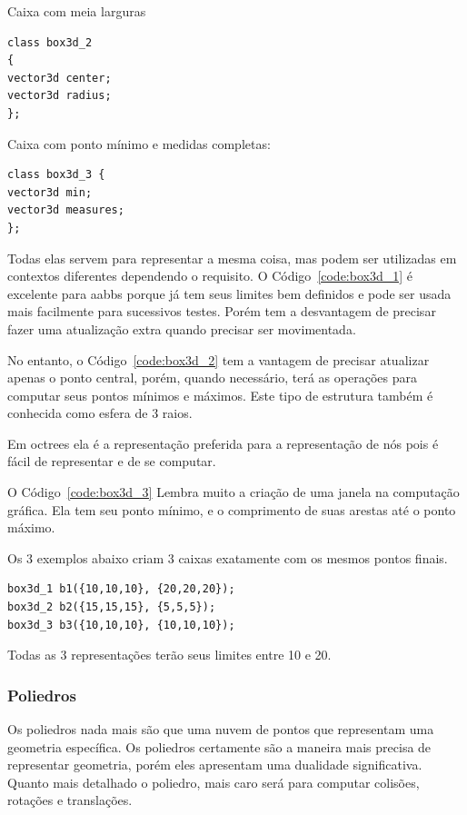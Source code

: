 Caixa com meia larguras

\begin{lstlisting}[frame=single,caption=Exemplo de caixa com meias larguras\label{code:box3d_2}]
class box3d_2
{
vector3d center;
vector3d radius;
};
\end{lstlisting}

Caixa com ponto mínimo e medidas completas:

\begin{lstlisting}[frame=single,caption=Exemplo de caixa  com arestas\label{code:box3d_3}]
class box3d_3 {
vector3d min;
vector3d measures;
};
\end{lstlisting}

Todas elas servem para representar a mesma coisa, mas podem ser utilizadas em
contextos diferentes dependendo o requisito. O Código~\ref{code:box3d_1} é excelente para aabbs
porque já tem seus limites bem definidos e pode ser usada mais facilmente para
sucessivos testes. Porém tem a desvantagem de precisar fazer uma atualização
extra quando precisar ser movimentada.

No entanto, o Código~\ref{code:box3d_2} tem a vantagem de precisar atualizar apenas o ponto
central, porém, quando necessário, terá as operações para computar seus pontos
mínimos e máximos. Este tipo de estrutura também é conhecida como esfera de 3
raios.

Em octrees ela é a representação preferida para a representação de nós
pois é fácil de representar e de se computar.

O Código~\ref{code:box3d_3} Lembra muito a criação de uma janela na computação gráfica. Ela tem seu
ponto mínimo, e o comprimento de suas arestas até o ponto máximo.

Os 3 exemplos abaixo criam 3 caixas exatamente com os mesmos pontos finais.

\begin{lstlisting}[frame=single,caption=Código de exemplo de criação de 3 caixas\label{example_box3d}]
box3d_1 b1({10,10,10}, {20,20,20});
box3d_2 b2({15,15,15}, {5,5,5});
box3d_3 b3({10,10,10}, {10,10,10});
\end{lstlisting}

Todas as 3 representações terão seus limites entre 10 e 20.


\subsubsection{Poliedros}

Os poliedros nada mais são que uma nuvem de pontos que representam uma
geometria específica. Os poliedros certamente são a maneira mais precisa de
representar geometria, porém eles apresentam uma dualidade significativa. Quanto mais
detalhado o poliedro, mais caro será para computar colisões, rotações e
translações.

